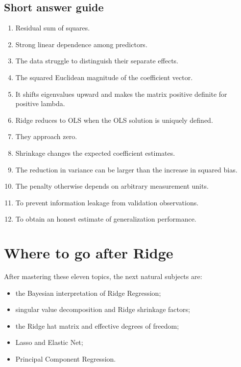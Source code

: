 \documentclass[11pt,a4paper]{article}
\numberwithin{equation}{section}
\theoremstyle{remark}
\begin{document}
\subsection*{Short answer guide}
\begin{enumerate}
\item Residual sum of squares.
\item Strong linear dependence among predictors.
\item The data struggle to distinguish their separate effects.
\item The squared Euclidean magnitude of the coefficient vector.
\item It shifts eigenvalues upward and makes the matrix positive definite for
positive lambda.
\item Ridge reduces to OLS when the OLS solution is uniquely defined.
\item They approach zero.
\item Shrinkage changes the expected coefficient estimates.
\item The reduction in variance can be larger than the increase in squared bias.
\item The penalty otherwise depends on arbitrary measurement units.
\item To prevent information leakage from validation observations.
\item To obtain an honest estimate of generalization performance.
\end{enumerate}


\section*{Where to go after Ridge}
After mastering these eleven topics, the next natural subjects are:
\begin{itemize}
\item the Bayesian interpretation of Ridge Regression;
\item singular value decomposition and Ridge shrinkage factors;
\item the Ridge hat matrix and effective degrees of freedom;
\item Lasso and Elastic Net;
\item Principal Component Regression.
\end{itemize}
\end{document}
